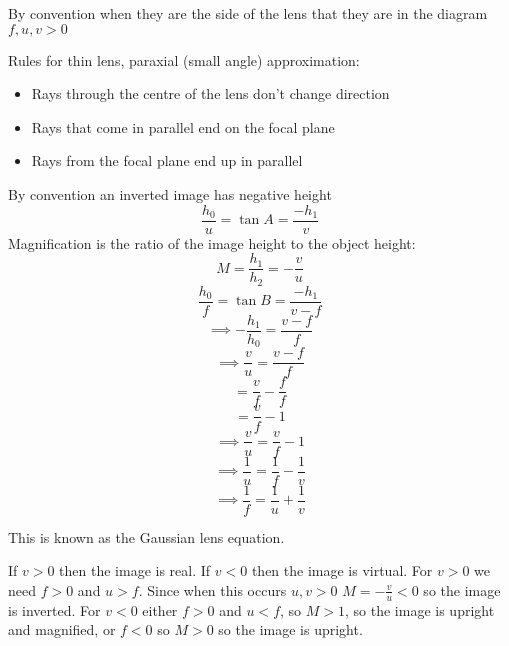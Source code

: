 By convention when they are the side of the lens that they are in the diagram \(f,u,v>0\)

Rules for thin lens, paraxial (small angle) approximation:
\begin{itemize}
\item Rays through the centre of the lens don't change direction
\item Rays that come in parallel end on the focal plane
\item Rays from the focal plane end up in parallel
\end{itemize}

\begin{center}
\end{center}

By convention an inverted image has negative height
\[\frac{h_0}{u}=\tan A=\frac{-h_1}{v}\]
Magnification is the ratio of the image height to the object height:
\[M=\frac{h_1}{h_2}=-\frac vu\]
\[\frac{h_0}{f}=\tan B=\frac{-h_1}{v-f}\]
\[\implies-\frac{h_1}{h_0}=\frac{v-f}{f}\]
\[\implies\frac vu=\frac{v-f}{f}\]
\[=\frac vf-\frac ff\]
\[=\frac vf-1\]
\[\implies\frac vu=\frac vf-1\]
\[\implies\frac 1u=\frac 1f-\frac 1v\]
\[\implies\frac 1f=\frac 1u+\frac 1v\]

This is known as the Gaussian lens equation.

If \(v>0\) then the image is real. If \(v<0\) then the image is virtual. For \(v>0\) we need \(f>0\) and \(u>f\). Since when this occurs \(u,v>0\) \(M=-\frac vu<0\) so the image is inverted. For \(v<0\) either \(f>0\) and \(u<f\), so \(M>1\), so the image is upright and magnified, or \(f<0\) so \(M>0\) so the image is upright.

